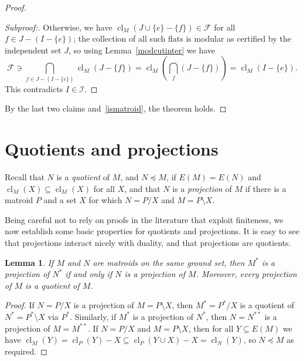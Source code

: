 \documentclass{amsart}
\theoremstyle{plain}
\newtheorem{lemma}[theorem]{Lemma}
\newcounter{defn}
\theoremstyle{definition}
\newtheorem{definition}[defn]{Definition}
\newcommand{\cF}{\mathcal{F}}
\newcommand{\cI}{\mathcal{I}}
\DeclareMathOperator{\cl}{cl}
\newcommand{\del}{\!\setminus\!}
\newcommand{\con}{/}
\newcommand{\br}[1]{\left(#1\right)}
\renewcommand{\ss}{\subseteq}
\newenvironment{subproof}[1][\proofname]{%
  \renewcommand{\qedsymbol}{$\blacksquare$}%
  \begin{proof}[Subproof:]%
}{%
  \end{proof}%
}
\begin{document}
\begin{proof}
\begin{subproof}
    Otherwise, we have $\cl_M(J \cup \{e\} - \{f\}) \in \cF$ for all $f \in J - (I - \{e\})$; 
    the collection of all such flats is modular as certified by the independent set $J$, 
    so using Lemma~\ref{modcutinter} we have
    \[\cF \ni \bigcap_{f \in J - (I - \{e\})} \cl_M(J - \{f\}) = \cl_M\br{\bigcap_f (J - \{f\})} = \cl_M(I - \{e\}).\]
    This contradicts $I \in \cI$. 
  \end{subproof}
  By the last two claims and~\ref{ismatroid}, the theorem holds. 
\end{proof}


\section{Quotients and projections}





Recall that $N$ is a \emph{quotient} of $M$, and $N \preceq M$, 
if $E(M) = E(N)$ and $\cl_M(X) \ss \cl_M(X)$ for all $X$, and that $N$ is a \emph{projection} of $M$ 
if there is a matroid $P$ and a set $X$ for which $N = P \con X$ and $M = P \del X$. 

Being careful not to rely on proofs in the literature that exploit finiteness, 
we now establish some basic properties for quotients and projections. 
It is easy to see that projections interact nicely with duality, and that projections are quotients. 

\begin{lemma}
  If $M$ and $N$ are matroids on the same ground set, then $M^*$ is a projection of $N^*$ 
  if and only if $N$ is a projection of $M$. Moreover, every projection of $M$ is a quotient of $M$.
\end{lemma}
\begin{proof}
  If $N = P \con X$ is a projection of $M = P \del X$, 
  then $M^* = P^* \con X$ is a quotient of $N^* = P^* \del X$ via $P^*$. 
  Similarly, if $M^*$ is a projection of $N^*$, then $N = N^{**}$ is a projection of $M = M^{**}$. 
  If $N = P \con X$ and $M = P \del X$, then for all $Y \ss E(M)$ we have 
  $\cl_M(Y) = \cl_P(Y) - X \ss \cl_P(Y \cup X) - X = \cl_N(Y)$, so $N \preceq M$ as required. 
\end{proof}
\end{document}
